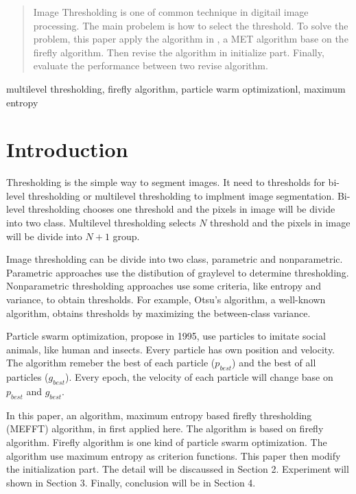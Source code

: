 \documentclass[conference]{IEEEtran}
\begin{document}


\begin{abstract}
Image Thresholding is one of common technique in digitail image processing. The main probelem is how to select the threshold. To solve the problem, this paper apply the algorithm in \cite{b1}, a MET algorithm base on the firefly algorithm. Then revise the algorithm in initialize part. Finally, evaluate the performance between two revise algorithm.
\end{abstract}

\begin{IEEEkeywords}
multilevel thresholding, firefly algorithm, particle warm optimizationl, maximum entropy
\end{IEEEkeywords}

\section{Introduction}
Thresholding is the simple way to segment images. It need to thresholds for bi-level thresholding or multilevel thresholding to implment image segmentation. Bi-level thresholding chooses one threshold and the pixels in image will be divide into two class. Multilevel thresholding selects $N$ threshold and the pixels in image will be divide into $N+1$ group.

Image thresholding can be divide into two class, parametric and nonparametric. Parametric approaches use the distibution of graylevel to determine thresholding. Nonparametric thresholding approaches use some criteria, like entropy and variance, to obtain thresholds. For example, Otsu's algorithm, a well-known algorithm, obtains thresholds by maximizing the between-class variance.

Particle swarm optimization, propose in 1995, use particles to imitate social animals, like human and insects. Every particle has own position and velocity. The algorithm remeber the best of each particle ($p_{best}$) and the best of all particles ($g_{best}$). Every epoch, the velocity of each particle will change base on $p_{best}$ and $g_{best}$.

In this paper, an algorithm, maximum entropy based firefly thresholding (MEFFT) algorithm, in \cite{b1} first applied here. The algorithm is based on firefly algorithm. Firefly algorithm is one kind of particle swarm optimization. The algorithm use maximum entropy as criterion functions. This paper then modify the initialization part. The detail will be discaussed in Section 2. Experiment will shown in Section 3. Finally, conclusion will be in Section 4.
\end{document}
